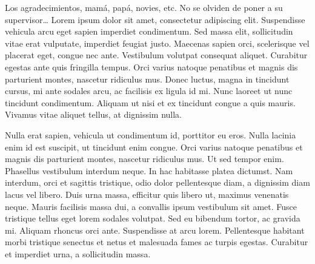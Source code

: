 \documentclass[letterpaper, english, 11pt]{MastersDoctoralThesis}  %
\begin{document}
\begin{acknowledgements}
\addchaptertocentry{\acknowledgementname} %
Los agradecimientos, mamá, papá, novies, etc. No se olviden de poner a su supervisor\ldots
Lorem ipsum dolor sit amet, consectetur adipiscing elit. Suspendisse vehicula arcu eget sapien imperdiet condimentum. Sed massa elit, sollicitudin vitae erat vulputate, imperdiet feugiat justo. Maecenas sapien orci, scelerisque vel placerat eget, congue nec ante. Vestibulum volutpat consequat aliquet. Curabitur egestas ante quis fringilla tempus. Orci varius natoque penatibus et magnis dis parturient montes, nascetur ridiculus mus. Donec luctus, magna in tincidunt cursus, mi ante sodales arcu, ac facilisis ex ligula id mi. Nunc laoreet ut nunc tincidunt condimentum. Aliquam ut nisi et ex tincidunt congue a quis mauris. Vivamus vitae aliquet tellus, at dignissim nulla.

Nulla erat sapien, vehicula ut condimentum id, porttitor eu eros. Nulla lacinia enim id est suscipit, ut tincidunt enim congue. Orci varius natoque penatibus et magnis dis parturient montes, nascetur ridiculus mus. Ut sed tempor enim. Phasellus vestibulum interdum neque. In hac habitasse platea dictumst. Nam interdum, orci et sagittis tristique, odio dolor pellentesque diam, a dignissim diam lacus vel libero. Duis urna massa, efficitur quis libero ut, maximus venenatis neque. Mauris facilisis massa dui, a convallis ipsum vestibulum sit amet. Fusce tristique tellus eget lorem sodales volutpat. Sed eu bibendum tortor, ac gravida mi. Aliquam rhoncus orci ante. Suspendisse at arcu lorem. Pellentesque habitant morbi tristique senectus et netus et malesuada fames ac turpis egestas. Curabitur et imperdiet urna, a sollicitudin massa.
\end{acknowledgements}


\tableofcontents %

\listoffigures %

\listoftables %

    
\end{document}
